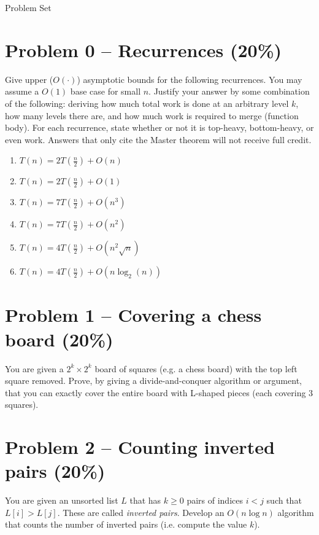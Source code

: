 \documentclass[12pt,letterpaper]{article}
\begin{document}
\begin{center}
    \LARGE Problem Set
\end{center}


\section*{Problem 0 -- Recurrences (20\%)}

Give upper ($O(\cdot)$) asymptotic bounds for the following recurrences.
You may assume a $O(1)$ base case for small $n$.
Justify your answer by some combination of the following: deriving how much total work is done at an arbitrary level $k$, how many levels there are, and how much work is required to merge (function body). 
For each recurrence, state whether or not it is top-heavy, bottom-heavy, or even work.
Answers that only cite the Master theorem will not receive full credit.

\begin{enumerate}
    \item $T(n)=2T \left( \frac{n}{2} \right)+O(n)$
    \item $T(n)=2T \left( \frac{n}{2} \right)+O(1)$
    \item $T(n)=7T \left( \frac{n}{2} \right)+O(n^3)$
    \item $T(n)=7T \left( \frac{n}{2} \right)+O(n^2)$
    \item $T(n)=4T \left( \frac{n}{2} \right)+O(n^2 \sqrt{n})$
    \item $T(n)=4T \left( \frac{n}{2} \right)+O(n \log_2(n))$
\end{enumerate}

\newpage

\section*{Problem 1 -- Covering a chess board (20\%)}
You are given a $2^k \times 2^k$ board of squares (e.g. a chess board) with the top left square removed.
Prove, by giving a divide-and-conquer algorithm or argument, that you can exactly cover the entire board with L-shaped pieces (each covering 3 squares).

\newpage

\section*{Problem 2 -- Counting inverted pairs (20\%)}
You are given an unsorted list $L$ that has $k\geq0$ pairs of indices $i < j$ such that $L[i] > L[j]$. 
These are called \textit{inverted pairs}.
Develop an $O(n\log n)$ algorithm that counts the number of inverted pairs (i.e. compute the value $k$).
\end{document}
